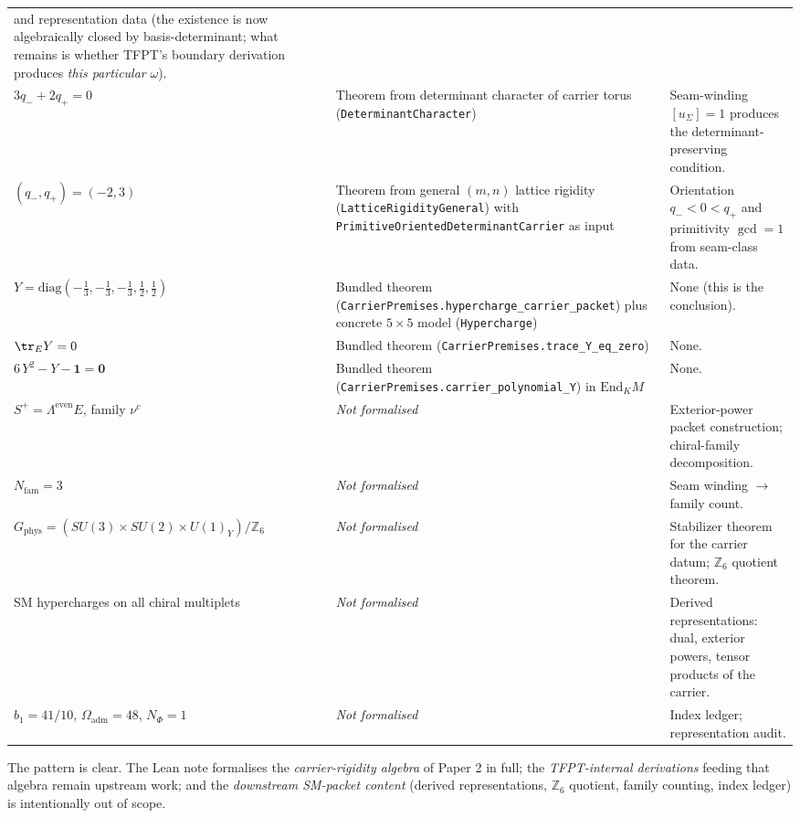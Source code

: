 \begin{center}
\begin{tabularx}{\textwidth}{@{}p{}p{}Y@{}}
  and representation data (the existence is now algebraically
  closed by basis-determinant; what remains is whether TFPT's
  boundary derivation produces \emph{this particular}
  $\omega$). \\[3pt]
$3 q_- + 2 q_+ = 0$ &
  Theorem from determinant character of carrier torus
  (\texttt{DeterminantCharacter}) &
  Seam-winding $[u_\Sigma] = 1$ produces the determinant-
  preserving condition. \\[3pt]
$(q_-, q_+) = (-2, 3)$ &
  Theorem from general $(m,n)$ lattice rigidity
  (\texttt{LatticeRigidityGeneral}) with
  \texttt{PrimitiveOrientedDeterminantCarrier} as input &
  Orientation $q_- < 0 < q_+$ and primitivity
  $\gcd = 1$ from seam-class data. \\[3pt]
$Y = \mathrm{diag}(-\tfrac13,-\tfrac13,-\tfrac13,\tfrac12,\tfrac12)$ &
  Bundled theorem
  (\texttt{CarrierPremises.hypercharge\_carrier\_packet}) plus
  concrete $5\times 5$ model (\texttt{Hypercharge}) &
  None (this is the conclusion). \\[3pt]
$\tr_E Y = 0$ &
  Bundled theorem
  (\texttt{CarrierPremises.trace\_Y\_eq\_zero}) &
  None. \\[3pt]
$6\, Y^2 - Y - \mathbf 1 = \mathbf 0$ &
  Bundled theorem
  (\texttt{CarrierPremises.carrier\_polynomial\_Y}) in
  $\mathrm{End}_K M$ &
  None. \\[3pt]
$S^+ = \Lambda^{\mathrm{even}} E$, family $\nu^c$ &
  \emph{Not formalised} &
  Exterior-power packet construction; chiral-family decomposition. \\[3pt]
$N_{\mathrm{fam}} = 3$ &
  \emph{Not formalised} &
  Seam winding $\to$ family count. \\[3pt]
$G_{\mathrm{phys}} = (SU(3)\times SU(2)\times U(1)_Y)/\mathbb Z_6$ &
  \emph{Not formalised} &
  Stabilizer theorem for the carrier datum; $\mathbb Z_6$
  quotient theorem. \\[3pt]
SM hypercharges on all chiral multiplets &
  \emph{Not formalised} &
  Derived representations: dual, exterior powers,
  tensor products of the carrier. \\[3pt]
$b_1 = 41/10$, $\Omega_{\mathrm{adm}} = 48$, $N_\Phi = 1$ &
  \emph{Not formalised} &
  Index ledger; representation audit. \\
\bottomrule
\end{tabularx}
\end{center}

\smallskip\noindent
The pattern is clear. The Lean note formalises the
\emph{carrier-rigidity algebra} of Paper 2 in full; the
\emph{TFPT-internal derivations} feeding that algebra remain
upstream work; and the \emph{downstream SM-packet content}
(derived representations, $\mathbb Z_6$ quotient, family
counting, index ledger) is intentionally out of scope.

